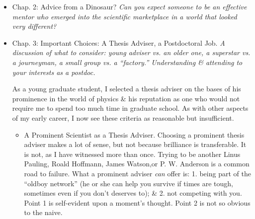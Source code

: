\documentclass{article}
\begin{document}
\begin{enumerate}
\begin{itemize}
\begin{itemize}
			One does not have to be a rocket scientist, as they say, to appreciate that B.'s 2-year stint as a graduate student in experimental physics was inadequate preparation for him to perform at the level of his supposed peers. Nevertheless, unmentored, B. was not willing to risk his all-too-sweet regular staff position by choosing the training that he badly needed. This was a mistake. After 3 years of buying equipment \& setting up a lab, B. had still not established a research program, \& indeed had little idea of what he wanted to accomplish as a scientist. Thus, despite its investment in his laboratory equipment, \& despite his nominally very impressive pedigree, B.'s employer moved him out of basic research. In an environment where goals were clearly defined from above, he eventually matured into a real contributor \& is reasonably happy. On the other hand, he is not doing basic research any more, \& he went through several very stressful years as a result of his bad start. Sadly, his failure at work coincided with the breakup of his marriage, an unhappy fate shared by many whose scientific careers flounder.
			\item {\sf The PhD Technician.}
		\end{itemize}

		\item {\sf Chap. 2: Advice from a Dinosaur?} {\it Can you expect someone to be an effective mentor who emerged into the scientific marketplace in a world that looked very different?}

		\item {\sf Chap. 3: Important Choices: A Thesis Adviser, a Postdoctoral Job.} {\it A discussion of what to consider: young adviser vs. an older one, a superstar vs. a journeyman, a small group vs. a ``factory.'' Understanding \& attending to your interests as a postdoc.}

		As a young graduate student, I selected a thesis adviser on the bases of his prominence in the world of physics \& his reputation as one who would not require me to spend too much time in graduate school. As with other aspects of my early career, I now see these criteria as reasonable but insufficient.
		\begin{itemize}
			\item {\sf A Prominent Scientist as a Thesis Adviser.} Choosing a prominent thesis adviser makes a lot of sense, but not because brilliance is transferable. It is not, as I have witnessed more than once. Trying to be another Linus Pauling, Roald Hoffmann, James Watson,or P. W. Anderson is a common road to failure. What a prominent adviser \textit{can} offer is: 1. being part of the ``oldboy network'' (he or she can help you survive if times are tough, sometimes even if you don't deserves to); \& 2. not competing with you. Point 1 is self-evident upon a moment's thought. Point 2 is not so obvious to the naive.


\end{itemize}
\end{itemize}
\end{enumerate}
\end{document}
